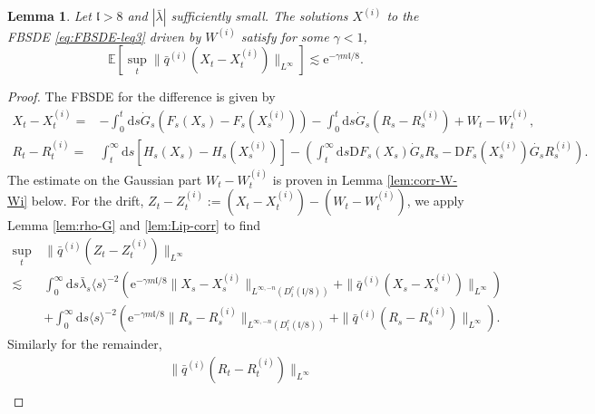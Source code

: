 \documentclass[11pt, a4paper]{scrartcl}
\numberwithin{equation}{section}
\theoremstyle{plain}
\newtheorem{lemma}[foo]{Lemma}
\theoremstyle{remark}
\newcommand{\assign}{:=}
\newcommand{\mathD}{\mathrm{D}}
\newcommand{\mathd}{\mathrm{d}}
\newcommand{\mathe}{\mathrm{e}}
\newcommand{\nosymbol}{}
\begin{document}
\begin{lemma}
	\label{lem:FBSDE-decay-est}Let $\mathfrak{l}> 8$ and $|\bar{\lambda}|$ sufficiently small.
	The solutions $X^{(i)}$ to
	the FBSDE \eqref{eq:FBSDE-leq3} driven by $W^{(i)}$ satisfy for some $\gamma
		< 1$,
	\[ \mathbb{E} \left[\sup_t \| \bar{q}^{(i)} (X_t - X_t^{(i)}) \|_{L^{\infty}}\right]
		\lesssim \mathe^{- \gamma m\mathfrak{l}/ 8} . \]
\end{lemma}

\begin{proof}
	The FBSDE for the difference is given by
		{\footnotesize\[  \begin{aligned}
					X_t - X_t^{(i)} = & -\int_{0^{\nosymbol}}^t \mathd s \dot{G}_s (F_s
					(X_s^{\nosymbol})-F_s (X_s^{(i)})) - \int_0^t \mathd s \dot{G}_s (R_s-R_s^{(i)}) + W_t - W_t^{(i)}, \\
					R_t - R_t^{(i)} = & \int_t^{\infty} \mathd s [H_s (X_s) - H_s
							(X_s^{(i)})]- \left(\int_t^{\infty} \mathd s \mathD F_s (X^{\nosymbol}_s)
					\dot{G}_s R_s - \mathD F_s (X_s^{(i)}) \dot{G_s} R_s^{(i)}\right) .
				\end{aligned}  \]}
	The estimate on the Gaussian part $W_t - W_t^{(i)}$ is proven in Lemma
	\ref{lem:corr-W-Wi} below. For the drift, $Z_t - Z_t^{(i)} \assign (X_t -
		X_t^{(i)}) - (W_t - W_t^{(i)})$, we apply Lemma \ref{lem:rho-G} and \ref{lem:Lip-corr} to find
	\begin{equation}
		\begin{aligned}
			\sup_t\, & \| \bar{q}^{(i)} (Z_t - Z_t^{(i)}) \|_{L^{\infty}}            \\
			\lesssim &
			\int_0^{\infty} \mathd s \bar{\lambda}_s \langle s \rangle^{- 2} (\mathe^{-
				\gamma m\mathfrak{l}/ 8} \| X_s - X_s^{(i)} \|_{L^{\infty, - n} (D_i^c
					(\mathfrak{l}/ 8))} + \| \bar{q}^{(i)} (X_s - X_s^{(i)})
			\|_{L^{\infty}})                                                         \\
			         & + \int_0^{\infty} \mathd s \langle s \rangle^{- 2} (\mathe^{-
				\gamma m\mathfrak{l}/ 8} \| R_s - R_s^{(i)} \|_{L^{\infty, - n} (D_i^c
					(\mathfrak{l}/ 8))} + \| \bar{q}^{(i)} (R_s - R_s^{(i)})
			\|_{L^{\infty}}) .
		\end{aligned} \label{eq:Z-Zi}
	\end{equation}
	Similarly for the remainder,
	\begin{equation}
		\begin{aligned}
			         & \| \bar{q}^{(i)} (R_t - R_t^{(i)}) \|_{L^{\infty}}                  \\

\end{aligned}
\end{equation}
\end{proof}
\end{document}
